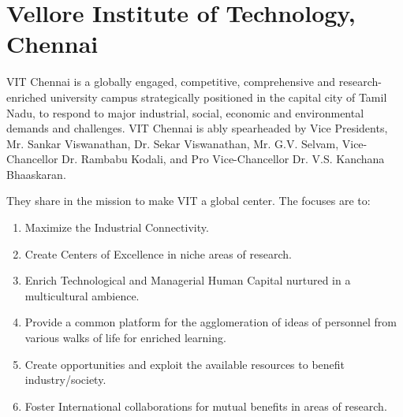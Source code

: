 
\section{Vellore Institute of Technology, Chennai}
VIT Chennai is a globally engaged, competitive, comprehensive and research-enriched university campus strategically positioned in the capital city of Tamil Nadu, to respond to major industrial, social, economic and environmental demands and challenges. VIT Chennai is ably spearheaded by Vice Presidents, Mr. Sankar Viswanathan, Dr. Sekar Viswanathan, Mr. G.V. Selvam, Vice-Chancellor Dr. Rambabu Kodali, and Pro Vice-Chancellor Dr. V.S. Kanchana Bhaaskaran. 

They share in the mission to make VIT a global center. The focuses are to:

\begin{enumerate}[label={\color{primaryColor}$\bullet$}]
	\item Maximize the Industrial Connectivity.
	\item Create Centers of Excellence in niche areas of research.
	\item Enrich Technological and Managerial Human Capital nurtured in a multicultural ambience.
	\item Provide a common platform for the agglomeration of ideas of personnel from various walks of life for enriched learning.
	\item Create opportunities and exploit the available resources to benefit industry/society.
	\item Foster International collaborations for mutual benefits in areas of research.
\end{enumerate}


